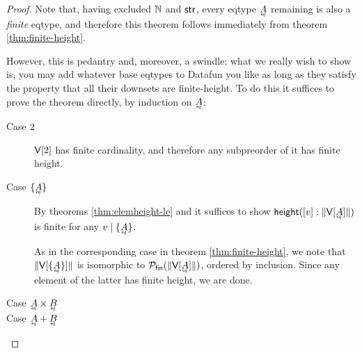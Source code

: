 \documentclass{article}
\newcommand{\eqposet}[1]{\ms{Eq}(#1)}
\renewcommand{\eqposet}[1]{\|{#1}\|}
\newcommand{\eqclass}[1]{[#1]}
\newcommand{\height}{\ms{height}}
\newcommand{\elemheight}[2]{\height(#2 : #1)}
\newcommand{\down}[2]{\mathop{\downarrow}(#2 : #1)}
\newcommand{\Val}[1]{\ms{V}[#1]}
\begin{document}
\begin{proof}
  Note that, having excluded $\mathbb{N}$ and $\mathsf{str}$, every eqtype $\eq{A}$ remaining is
  also a \emph{finite} eqtype, and therefore this theorem follows immediately
  from theorem \ref{thm:finite-height}.

  However, this is pedantry and, moreover, a swindle: what we really wish to
  show is, you may add whatever base eqtypes to Datafun you like as long as they
  satisfy the property that all their downsets are finite-height. To do this it
  suffices to prove the theorem directly, by induction on $\eq{A}$:
  \begin{description}
  \item[Case $2$] $\Val{\bool}$ has finite cardinality, and therefore any
    subpreorder of it has finite height.


  \item[Case $\Set{\eq{A}}$] By theorems \ref{thm:elemheight-le} and it suffices
    to show $\elemheight{\eqposet{\Val{\eq{A}}}}{\eqclass{v}}$ is finite for any
    $\lr{\Set{\eq{A}}}{v}$.

    As in the corresponding case in theorem \ref{thm:finite-height}, we note
    that $\eqposet{\Val{\Set{\eq{A}}}}$ is isomorphic to
    $\Pfin(\eqposet{\Val{\eq{A}}})$, ordered by inclusion. Since any element of
    the latter has finite height, we are done.



  \item[Case $\eq{A} \x \eq{B}$] \TODO
  \item[Case $\eq{A} + \eq{B}$] \TODO
  \end{description}
\end{proof}
\end{document}

